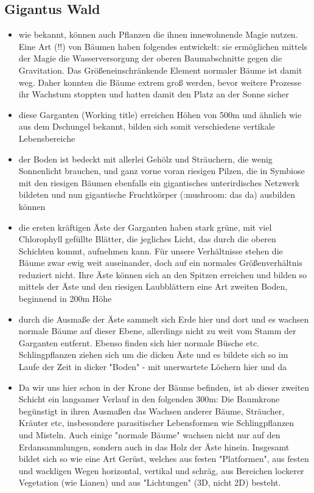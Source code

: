 \subsection{Gigantus Wald} \label{formation:gigantus}
\begin{itemize}
	\item wie bekannt, können auch Pflanzen die ihnen innewohnende Magie nutzen. Eine Art (!!) von Bäumen haben folgendes entwickelt: sie ermöglichen mittels der Magie die Wasserversorgung der oberen Baumabschnitte gegen die Gravitation. Das Größeneinschränkende Element normaler Bäume ist damit weg. Daher konnten die Bäume extrem groß werden, bevor weitere Prozesse ihr Wachstum stoppten und hatten damit den Platz an der Sonne sicher
	\item  diese Garganten (Working title) erreichen Höhen von 500m und ähnlich wie aus dem Dschungel bekannt, bilden sich somit verschiedene vertikale Lebensbereiche
	\item der Boden ist bedeckt mit allerlei Gehölz und Sträuchern, die wenig Sonnenlicht brauchen, und ganz vorne voran riesigen Pilzen, die in Symbiose mit den riesigen Bäumen ebenfalls ein gigantisches unterirdisches Netzwerk bildeten und nun gigantische Fruchtkörper (:mushroom:  das da) ausbilden können
	\item die ersten kräftigen Äste der Garganten haben stark grüne, mit viel Chlorophyll gefüllte Blätter, die jegliches Licht, das durch die oberen Schichten kommt, aufnehmen kann. Für unsere Verhältnisse stehen die Bäume zwar ewig weit auseinander, doch auf ein normales Größenverhältnis reduziert nicht. Ihre Äste können sich an den Spitzen erreichen und bilden so mittels der Äste und den riesigen Laubblättern eine Art zweiten Boden, beginnend in 200m Höhe
	\item durch die Ausmaße der Äste sammelt sich Erde hier und dort und es wachsen normale Bäume auf dieser Ebene, allerdings nicht zu weit vom Stamm der Garganten entfernt. Ebenso finden sich hier normale Büsche etc. Schlingpflanzen ziehen sich um die dicken Äste und es bildete sich so im Laufe der Zeit in dicker "Boden" - mit unerwartete Löchern hier und da
	\item Da wir uns hier schon in der Krone der Bäume befinden, ist ab dieser zweiten Schicht ein langsamer Verlauf in den folgenden 300m: Die Baumkrone begünstigt in ihren Ausmaßen das Wachsen anderer Bäume, Sträucher, Kräuter etc, insbesondere parasitischer Lebensformen wie Schlingpflanzen und Misteln. Auch einige "normale Bäume" wachsen nicht nur auf den Erdansammlungen, sondern auch in das Holz der Äste hinein. Insgesamt bildet sich so wie eine Art Gerüst, welches aus festen "Platformen", aus festen und wackligen Wegen horizontal, vertikal und schräg, aus Bereichen lockerer Vegetation (wie Lianen) und aus "Lichtungen" (3D, nicht 2D) besteht.

\end{itemize}
